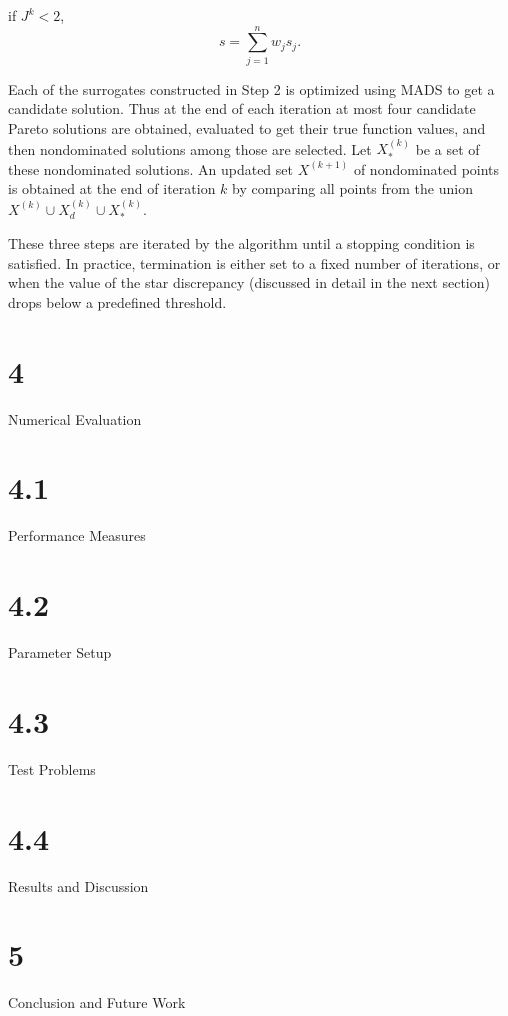 \par\noindent if $J^k < 2$,\quad  
$$s = \sum_{j=1}^n w_js_j.$$\smallskip

\smallskip

\noindent Each of the surrogates constructed in Step 2 is optimized using MADS 
to get a candidate solution. Thus at the end of each iteration at most four 
candidate Pareto solutions are obtained, evaluated to get their true function 
values, and then nondominated solutions among those are selected. Let $X_*^{
(k)}$ be a set of these nondominated solutions. An updated set $X^{(k+1)}$ of 
nondominated points is obtained at the end of iteration $k$ by comparing all 
points from the  union $X^{(k)}\cup X_d^{(k)}\cup X_*^{(k)}$.

These three steps are iterated by the algorithm until a stopping 
condition is satisfied. In practice, termination is either set to a fixed 
number of iterations, or when the value of the star discrepancy (discussed 
in detail in the next section) drops below a predefined threshold.
\vskip -3pt

\section{4}{Numerical Evaluation}\vskip -3pt
\section{4.1}{Performance Measures}
\section{4.2}{Parameter Setup}
\section{4.3}{Test Problems}\vskip -3pt
\section{4.4}{Results and Discussion}\vskip -3pt

\section{5}{Conclusion and Future Work}

